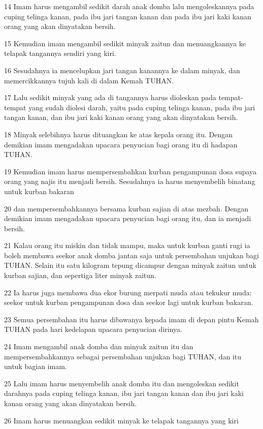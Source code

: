 \par 14 Imam harus mengambil sedikit darah anak domba lalu mengoleskannya pada cuping telinga kanan, pada ibu jari tangan kanan dan pada ibu jari kaki kanan orang yang akan dinyatakan bersih.
\par 15 Kemudian imam mengambil sedikit minyak zaitun dan menuangkannya ke telapak tangannya sendiri yang kiri.
\par 16 Sesudahnya ia mencelupkan jari tangan kanannya ke dalam minyak, dan memercikkannya tujuh kali di dalam Kemah TUHAN.
\par 17 Lalu sedikit minyak yang ada di tangannya harus dioleskan pada tempat-tempat yang sudah diolesi darah, yaitu pada cuping telinga kanan, pada ibu jari tangan kanan, dan ibu jari kaki kanan orang yang akan dinyatakan bersih.
\par 18 Minyak selebihnya harus dituangkan ke atas kepala orang itu. Dengan demikian imam mengadakan upacara penyucian bagi orang itu di hadapan TUHAN.
\par 19 Kemudian imam harus mempersembahkan kurban pengampunan dosa supaya orang yang najis itu menjadi bersih. Sesudahnya ia harus menyembelih binatang untuk kurban bakaran
\par 20 dan mempersembahkannya bersama kurban sajian di atas mezbah. Dengan demikian imam mengadakan upacara penyucian bagi orang itu, dan ia menjadi bersih.
\par 21 Kalau orang itu miskin dan tidak mampu, maka untuk kurban ganti rugi ia boleh membawa seekor anak domba jantan saja untuk persembahan unjukan bagi TUHAN. Selain itu satu kilogram tepung dicampur dengan minyak zaitun untuk kurban sajian, dan sepertiga liter minyak zaitun.
\par 22 Ia harus juga membawa dua ekor burung merpati muda atau tekukur muda: seekor untuk kurban pengampunan dosa dan seekor lagi untuk kurban bakaran.
\par 23 Semua persembahan itu harus dibawanya kepada imam di depan pintu Kemah TUHAN pada hari kedelapan upacara penyucian dirinya.
\par 24 Imam mengambil anak domba dan minyak zaitun itu dan mempersembahkannya sebagai persembahan unjukan bagi TUHAN, dan itu untuk bagian imam.
\par 25 Lalu imam harus menyembelih anak domba itu dan mengoleskan sedikit darahnya pada cuping telinga kanan, ibu jari tangan kanan dan ibu jari kaki kanan orang yang akan dinyatakan bersih.
\par 26 Imam harus menuangkan sedikit minyak ke telapak tangannya yang kiri
